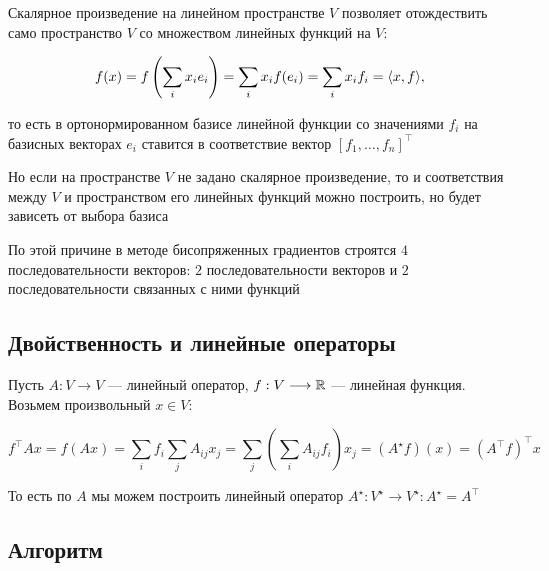 Скалярное произведение на линейном пространстве $V$ позволяет отождествить само пространство $V$ со множеством линейных функций на $V$:

\[
    f(x) = f \left( \sum\limits_i x_i e_i \right) = \sum\limits_i x_i f(e_i) = \sum\limits_i x_i f_i = \langle x, f \rangle,
\]

то есть в ортонормированном базисе линейной функции со значениями $f_i$ на базисных векторах $e_i$ ставится в соответствие вектор $[f_1, \ldots, f_n]^{\top}$

Но если на пространстве $V$ не задано скалярное произведение, то и соответствия между $V$ и пространством его линейных функций можно построить, но будет зависеть от выбора базиса

По этой причине в методе бисопряженных градиентов строятся $4$ последовательности векторов: $2$ последовательности векторов и $2$ последовательности связанных с ними функций

\subsection*{Двойственность и линейные операторы}

Пусть $A: V \longrightarrow V$ --- линейный оператор, $f: V \longrightarrow \operatorname{\mathbb R}$ --- линейная функция. Возьмем произвольный $x \in V$:

\[
    f^{\top} Ax = f(Ax) = \sum\limits_i f_i \sum\limits_j A_{ij} x_j = \sum\limits_j \left( \sum\limits_i A_{ij} f_i \right) x_j = (A^{\star} f)(x) = (A^{\top} f)^{\top} x
\]

То есть по $A$ мы можем построить линейный оператор $A^{\star}: V^{\star} \longrightarrow V^{\star}: A^{\star} = A^{\top}$


\subsection{Алгоритм}

